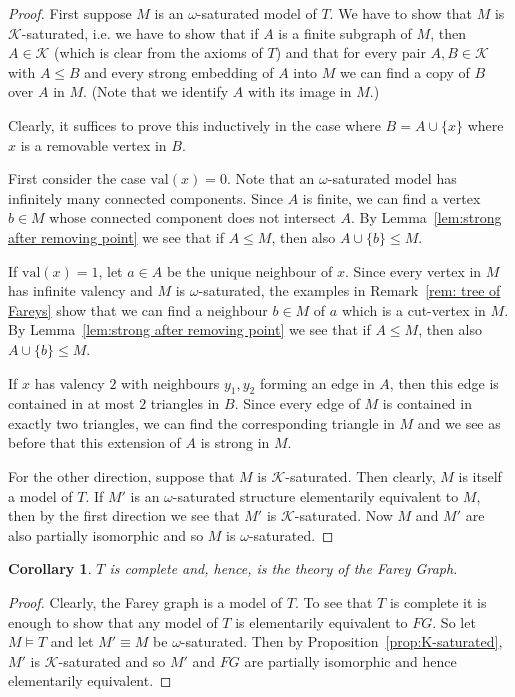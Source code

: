 \documentclass[10pt,a4paper]{amsart}
\newcommand{\K}{\mathcal{K}}
\newcommand{\val}{\mathrm{val}}
\newtheorem{corollary}[defi]{Corollary}
\begin{document}
\begin{proof}
First suppose $M$ is an $\omega$-saturated model of $T$. We have to show that  $M$ is $\K$-saturated, i.e. we have to show that if $A$ is a finite subgraph of $M$, then $A\in \K$ (which is clear from the axioms of $T$) and that for every pair $A, B\in \K$ with $A\leq B$ and  every strong embedding of $A$ into $M$ we can find a copy of $B$ over $A$ in $M$. (Note that we identify $A$ with its image in $M$.)

Clearly, it suffices to prove this inductively in the case where $B=A\cup\{x\}$ where $x$ is a removable vertex in $B$. 

First consider the case $\val(x)=0$. Note that an $\omega$-saturated model has infinitely many connected components. Since $A$ is finite, we can find a vertex $b\in M$ whose connected component does not intersect $A$. By Lemma~\ref{lem:strong after removing point} we see that if $A\leq M$, then also $A\cup\{ b\}\leq M$.

If $\val(x)=1$, let $a\in A$ be the unique neighbour of $x$. Since every vertex in $M$ has infinite valency and $M$ is $\omega$-saturated, the examples in Remark~\ref{rem: tree of Fareys} show that  we can find a neighbour $b\in M$ of $a$ which is a cut-vertex in $M$.  By Lemma~\ref{lem:strong after removing point} we see that if $A\leq M$, then also $A\cup\{ b\}\leq M$.

    If $x$ has valency $2$ with neighbours $y_1,y_2$ forming an edge in $A$, then this edge is contained in at most $2$ triangles in $B$. Since every edge of $M$ is contained in exactly two triangles, we can find the corresponding triangle in $M$ and we see as before that this extension of $A$ is strong in $M$.

    For the other direction, suppose that $M$ is $\K$-saturated. Then clearly, $M$ is itself a  model of $T$. If $M'$ is an $\omega$-saturated structure elementarily equivalent to $M$, then by the first direction we see that $M'$ is $\K$-saturated. Now $M$ and $M'$ are also partially isomorphic and so $M$ is $\omega$-saturated.
\end{proof}

\begin{corollary}\label{cor:th(FG)}
   $T$ is complete and, hence, is the theory of the Farey Graph.  
\end{corollary}
\begin{proof}
 Clearly, the Farey graph is a model of $T$. To see that $T$ is complete it  is enough to show that  any model of $T$ is elementarily equivalent to $FG$. So let $M\models T$ and let $M'\equiv M$ be $\omega$-saturated. Then by  Proposition~\ref{prop:K-saturated}, $M'$ is $\K$-saturated and so $M'$ and $FG$ are partially isomorphic and hence elementarily equivalent. 
\end{proof}
\end{document}
